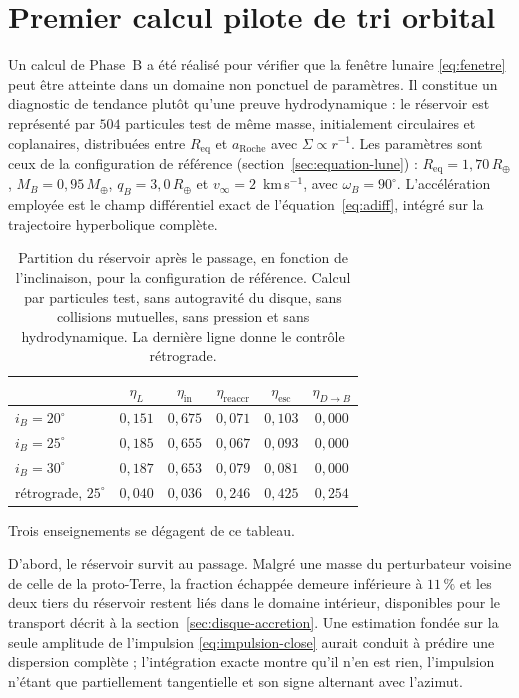 \documentclass[11pt,a4paper,openany]{report}
\newcommand{\Mt}{M_{\oplus}}
\newcommand{\Rt}{R_{\oplus}}
\newcommand{\Req}{R_{\mathrm{eq}}}
\newcommand{\aR}{a_{\mathrm{Roche}}}
\begin{document}
\section{Premier calcul pilote de tri orbital}
\label{sec:pilote-etaL}

Un calcul de Phase~B a été réalisé pour vérifier que la fenêtre lunaire \eqref{eq:fenetre} peut
être atteinte dans un domaine non ponctuel de paramètres. Il constitue un diagnostic de tendance
plutôt qu'une preuve hydrodynamique : le réservoir est représenté par $504$ particules test de même
masse, initialement circulaires et coplanaires, distribuées entre $\Req$ et $\aR$ avec
$\Sigma\propto r^{-1}$. Les paramètres sont ceux de la configuration de référence
(section~\ref{sec:equation-lune}) : $\Req=1{,}70\,\Rt$, $M_B=0{,}95\,\Mt$, $q_B=3{,}0\,\Rt$ et
$v_\infty=2$~km\,s$^{-1}$, avec $\omega_B=90^\circ$. L'accélération employée est le champ
différentiel exact de l'équation~\eqref{eq:adiff}, intégré sur la trajectoire hyperbolique complète.

\begin{table}[htbp]
\centering
\small
\caption{Partition du réservoir après le passage, en fonction de l'inclinaison, pour la
configuration de référence. Calcul par particules test, sans autogravité du disque, sans collisions
mutuelles, sans pression et sans hydrodynamique. La dernière ligne donne le contrôle rétrograde.}
\label{tab:pilote-etaL}
\begin{tabular}{l|ccccc}
\toprule
& $\eta_L$ & $\eta_{\mathrm{in}}$ & $\eta_{\mathrm{reaccr}}$ & $\eta_{\mathrm{esc}}$ &
$\eta_{D\to B}$ \\
\midrule
$i_B=20^\circ$ & $0{,}151$ & $0{,}675$ & $0{,}071$ & $0{,}103$ & $0{,}000$ \\
$i_B=25^\circ$ & $0{,}185$ & $0{,}655$ & $0{,}067$ & $0{,}093$ & $0{,}000$ \\
$i_B=30^\circ$ & $0{,}187$ & $0{,}653$ & $0{,}079$ & $0{,}081$ & $0{,}000$ \\
\midrule
rétrograde, $25^\circ$ & $0{,}040$ & $0{,}036$ & $0{,}246$ & $0{,}425$ & $0{,}254$ \\
\bottomrule
\end{tabular}
\end{table}

Trois enseignements se dégagent de ce tableau.

D'abord, le réservoir survit au passage. Malgré une masse du perturbateur voisine de celle de la
proto-Terre, la fraction échappée demeure inférieure à $11\,\%$ et les deux tiers du réservoir
restent liés dans le domaine intérieur, disponibles pour le transport décrit à la
section~\ref{sec:disque-accretion}. Une estimation fondée sur la seule amplitude de l'impulsion
\eqref{eq:impulsion-close} aurait conduit à prédire une dispersion complète ; l'intégration exacte
montre qu'il n'en est rien, l'impulsion n'étant que partiellement tangentielle et son signe
alternant avec l'azimut.
\end{document}
